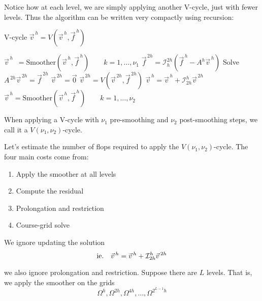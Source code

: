 
Notice how at each level, we are simply applying another V-cycle, just with
fewer levels. Thus the algorithm can be written very compactly using recursion:

\begin{algorithm}
    \caption{V-cycle  $\vec{v}^{\,h}=V\left( \vec{v}^{\,h}, \vec{f}^{\,h} \right)$}
    \begin{algorithmic} 
      \STATE $\vec{v}^{\,h} \enspace = \text{Smoother}(\vec{v}^{\,h}, \vec{f}^{\,h}) \qquad k=1, \ldots, \nu_1$ 
      \STATE $\vec{f}^{\,2h} = \mathcal{I}_{h}^{2h}(\vec{f}^{\,h} - A^h\vec{v}^{\,h})$
      \STATE Solve $A^{\,2h}\vec{v}^{\,2h} = \vec{f}^{\,2h}$
      \ELSE
      \STATE $\vec{v}^{\,2h} = \vec{0}$
      \STATE $\vec{v}^{\,2h} = V(\vec{v}^{\,2h}, \vec{f}^{\,2h})$
      \ENDIF
      \STATE $\vec{v}^{\,h}  = \vec{v}^{\,h} + \mathcal{I}_{2h}^{h}\vec{v}^{\,2h}$
      \STATE $\vec{v}^{\,h} = \text{Smoother}(\vec{v}^{\,h}, \vec{f}^{\,h}) \qquad k=1, \ldots, \nu_2$ 
    \end{algorithmic} 
\end{algorithm}

When applying a V-cycle with $\nu_1$ pre-smoothing and $\nu_2$ post-smoothing
steps, we call it a $V(\nu_1, \nu_2)$-cycle.

Let's estimate the number of flops required  to apply the $V(\nu_1,
\nu_2)$-cycle. The four main costs come from:

\begin{enumerate}[1)]
\item Apply the smoother at all levels
\item Compute the residual
\item Prolongation and restriction
\item Course-grid solve
\end{enumerate}


We ignore updating the solution
\begin{equation*}
\text{ie.\quad}\vec{v}^{\,h}  = \vec{v}^{\,h} + \mathcal{I}_{2h}^{h}\vec{v}^{\,2h}
\end{equation*}

we also ignore prolongation and restriction. Suppose there are $L$ levels. That
is, we apply the smoother on the grids
\begin{equation*}
\Omega^{h},
\Omega^{2h},
\Omega^{4h},
\ldots,
\Omega^{2^{L-1}h}
\end{equation*}

